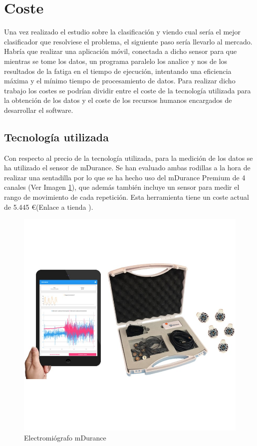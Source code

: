 \section{Coste}
Una vez realizado el estudio sobre la clasificación y viendo cual sería el mejor clasificador que resolviese el problema, el siguiente paso sería llevarlo al mercado. Habría que realizar una aplicación móvil, conectada a dicho sensor para que mientras se tome los datos, un programa paralelo los analice y nos de los resultados de la fatiga en el tiempo de ejecución, intentando una eficiencia máxima y el mínimo tiempo de procesamiento de datos. Para realizar dicho trabajo los costes se podrían dividir entre el coste de la tecnología utilizada para la obtención de los datos y el coste de los recursos humanos encargados de desarrollar el software.

\subsection{Tecnología utilizada}
Con respecto al precio de la tecnología utilizada, para la medición de los datos se ha utilizado el sensor de mDurance. Se han evaluado ambas rodillas a la hora de realizar una sentadilla por lo que se ha hecho uso del mDurance Premium de 4 canales (Ver Imagen \ref{fig:mDurance}), que además también incluye un sensor para medir el rango de movimiento de cada repetición. Esta herramienta tiene un coste actual de 5.445 \euro \thinspace\thinspace(Enlace a tienda \cite{informacionPreciomdurance}).

\begin{figure}[ht]
\centering
\includegraphics[scale=0.3]{imagenes/electromiografo-de-superficie-de-dos-canales-mdurance-pro.jpg}
\caption{ Electromiógrafo mDurance \cite{electrodosMdurance}}
\label{fig:mDurance}
\end{figure}

